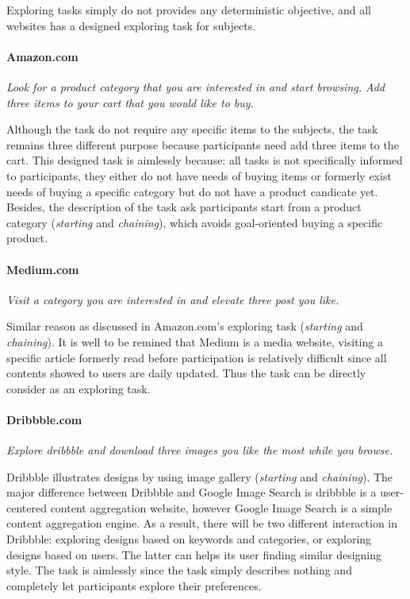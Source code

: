 Exploring tasks simply do not provides any deterministic objective,
and all websites has a designed exploring task for subjects.

\paragraph{Amazon.com} \emph{Look for a product category that you are interested in and start browsing. 
        Add three items to your cart that you would like to buy.}

Although the task do not require any specific items to the subjects, the task remains three different
purpose because participants need add three items to the cart. This designed task 
is aimlessly because: all tasks is not specifically informed to participants, 
they either do not have needs of buying items or 
formerly exist needs of buying a specific category but do not have a product candicate yet.
Besides, the description of the task ask participants start from a product category (\emph{starting} and \emph{chaining}), which avoids 
goal-oriented buying a specific product.

\paragraph{Medium.com} \emph{Visit a category you are interested in and elevate three post you like.}

Similar reason as discussed in Amazon.com's exploring task (\emph{starting} and \emph{chaining}). 
It is well to be remined that Medium is a media
website, visiting a specific article formerly read before participation is relatively difficult 
since all contents showed to users are daily updated. Thus the task can be directly consider as an exploring task.

\paragraph{Dribbble.com} \emph{Explore dribbble and download three images you like the most while you browse.}

Dribbble illustrates designs by using image gallery (\emph{starting} and \emph{chaining}). 
The major difference between Dribbble and Google Image Search
is dribbble is a user-centered content aggregation website, however Google Image Search is a simple content aggregation engine.
As a result, there will be two different interaction in Dribbble: exploring designs based on keywords and categories,
or exploring designs based on users. The latter can helps its user finding similar designing style.
The task is aimlessly since the task simply describes nothing and completely let participants explore their preferences.

